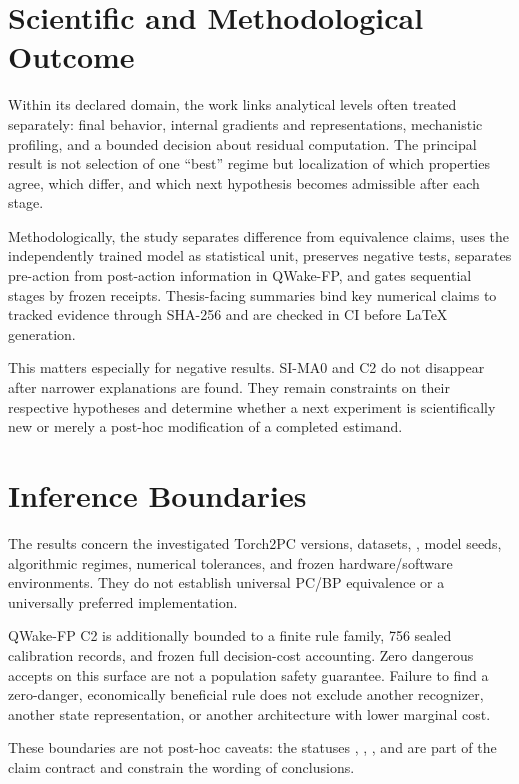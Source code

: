 \section{Scientific and Methodological Outcome}
\label{sec:conclusion-contribution-en}

Within its declared domain, the work links analytical levels often treated separately:
final behavior, internal gradients and representations, mechanistic profiling, and a
bounded decision about residual computation. The principal result is not selection of
one ``best'' regime but localization of which properties agree, which differ, and which
next hypothesis becomes admissible after each stage.

Methodologically, the study separates difference from equivalence claims, uses the
independently trained model as statistical unit, preserves negative tests, separates
pre-action from post-action information in QWake-FP, and gates sequential stages by
frozen receipts. Thesis-facing summaries bind key numerical claims to tracked evidence
through SHA-256 and are checked in CI before LaTeX generation.

This matters especially for negative results. SI-MA0 and C2 do not disappear after
narrower explanations are found. They remain constraints on their respective
hypotheses and determine whether a next experiment is scientifically new or merely a
post-hoc modification of a completed estimand.

\section{Inference Boundaries}

The results concern the investigated Torch2PC versions, datasets,
, model seeds, algorithmic regimes, numerical tolerances, and
frozen hardware/software environments. They do not establish universal PC/BP
equivalence or a universally preferred implementation.

QWake-FP C2 is additionally bounded to a finite rule family, 756 sealed calibration
records, and frozen full decision-cost accounting. Zero dangerous accepts on this
surface are not a population safety guarantee. Failure to find a zero-danger,
economically beneficial rule does not exclude another recognizer, another state
representation, or another architecture with lower marginal cost.

These boundaries are not post-hoc caveats: the statuses ,
, , and  are part of the
claim contract and constrain the wording of conclusions.

